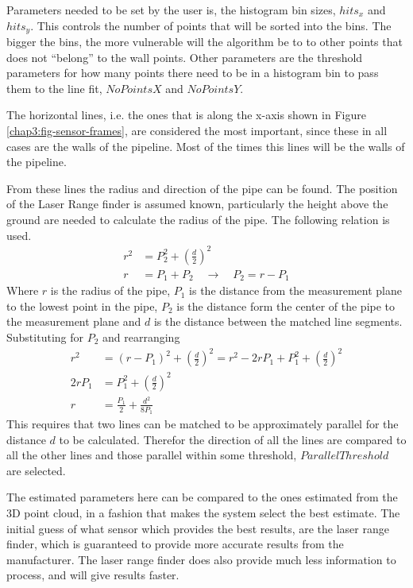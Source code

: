 Parameters needed to be set by the user is, the histogram bin sizes, $hits_x$ and
$hits_y$. This controls the number of points that will be sorted into the bins. The bigger
the bins, the more vulnerable will the algorithm be to to
other points that does not ``belong'' to the wall points. Other parameters are the
threshold parameters for how many points there need to be in a histogram bin to pass them
to the line fit, $NoPointsX$ and $NoPointsY$.\

The horizontal lines, i.e. the ones that is along the x-axis shown in Figure
\ref{chap3:fig-sensor-frames}, are considered the most important, since these in all cases
are the walls of the pipeline. Most of the times this lines will be the walls of the
pipeline. 

From these lines the radius and direction of the pipe can be found. The position of the
Laser Range finder is assumed known, particularly the height above the ground are needed
to calculate the radius of the pipe. The following relation is used.
\begin{align}
    r^2 &= P_2^2 + \left(\frac{d}{2} \right)^2 \\
    r &= P_1 + P_2  \quad \rightarrow \quad P_2 = r - P_1
\end{align}
Where $r$ is the radius of the pipe, $P_1$ is the distance from the measurement plane to
the lowest point in the pipe, $P_2$ is the distance form the center of the pipe to the
measurement plane and $d$ is the distance between the matched line segments. Substituting
for $P_2$ and rearranging
\begin{equation}
    \begin{aligned}
        r^2& = (r - P_1)^2 + \left(\frac{d}{2}\right)^2 = r^2 - 2 r P_1 + P_1^2 +
        \left(\frac{d}{2}\right)^2 \\
        2 r P_1 &= P_1^2 + \left(\frac{d}{2}\right)^2 \\
        r &= \frac{P_1}{2} + \frac{d^2}{8 P_1}
    \end{aligned}
\end{equation}
This requires that two lines can be matched to be approximately parallel for the distance
$d$ to be calculated. Therefor the direction of all the lines are compared to all the
other lines and those parallel within some threshold, $ParallelThreshold$ are selected.

The estimated parameters here can be compared to the ones estimated from the 3D point
cloud, in a fashion that makes the system select the best estimate. The initial guess of
what sensor which provides the best results, are the laser range finder, which is
guaranteed to provide more accurate results from the manufacturer. The laser range finder
does also provide much less information to process, and will give results faster. 


